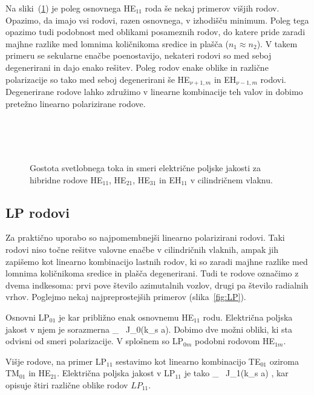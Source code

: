 Na sliki~(\ref{fig:HE11}) je poleg osnovnega HE$_{11}$ roda še nekaj primerov višjih rodov. Opazimo, 
da imajo vsi rodovi, razen osnovnega, v izhodišču minimum. Poleg tega opazimo tudi podobnost med 
oblikami posameznih rodov, do katere pride zaradi majhne razlike med lomnima količnikoma sredice in plašča
($n_1 \approx n_2$). V takem primeru se sekularne enačbe poenostavijo, nekateri rodovi so 
med seboj degenerirani in dajo enako rešitev. Poleg rodov enake oblike in različne polarizacije so tako 
med seboj degenerirani še HE$_{\nu+1,m}$ in EH$_{\nu-1,m}$ rodovi. Degenerirane 
rodove lahko združimo v linearne kombinacije teh valov in dobimo pretežno linearno polarizirane 
rodove. 
\begin{figure}[h]
\centering
\def\svgwidth{90truemm} 
\\
\def\svgwidth{90truemm} 
 \\
\def\svgwidth{90truemm} 
 \\
\def\svgwidth{90truemm} 

\caption{Gostota svetlobnega toka in smeri električne poljske jakosti za hibridne rodove
HE$_{11}$, HE$_{21}$, HE$_{31}$ in EH$_{11}$ v cilindričnem vlaknu.}
\label{fig:HE11}
\end{figure}

\subsection*{LP rodovi}
Za praktično uporabo so najpomembnejši linearno polarizirani rodovi. Taki rodovi niso
točne rešitve valovne enačbe v cilindričnih vlaknih, ampak jih zapišemo kot linearno 
kombinacijo lastnih rodov, ki so zaradi majhne razlike med lomnima količnikoma sredice
in plašča degenerirani. Tudi te rodove označimo z dvema indkesoma: prvi pove število azimutalnih
vozlov, drugi pa število radialnih vrhov. Poglejmo nekaj najpreprostejših primerov (slika~\ref{fig:LP}).

Osnovni LP$_{01}$ je kar približno enak osnovnemu HE$_{11}$ rodu. 
Električna poljska jakost v njem je 
sorazmerna
\beq
{}_  \, J_0(k_s a).
\eeq
Dobimo dve možni obliki, ki sta odvisni od smeri polarizacije.
V splošnem so LP$_{0m}$ podobni rodovom HE$_{1m}$. 

Višje rodove, na primer LP$_{11}$ sestavimo kot linearno kombinacijo 
TE$_{01}$ oziroma TM$_{01}$ in HE$_{21}$.
Električna poljska jakost v LP$_{11}$ je tako 
\beq
{}_  \, J_1(k_s a)
{ \cos\varphi \brace \sin\varphi},
\eeq
kar opisuje štiri različne oblike rodov $LP_{11}$.

